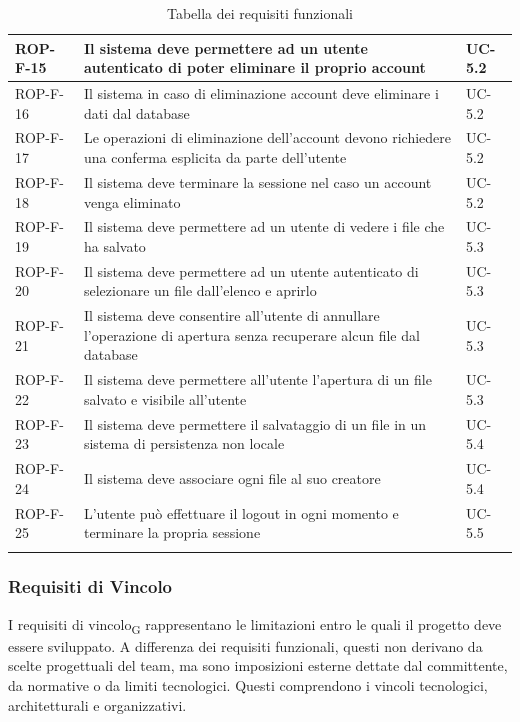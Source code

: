 \documentclass[11pt,a4paper]{article}
\begin{document}
\begin{longtable}{|p{}|>{\raggedright\arraybackslash}p{}|p{}|}
\hline
ROP-F-15 & Il sistema deve permettere ad un utente autenticato di poter eliminare il proprio account & UC-5.2 \\
\hline
ROP-F-16 & Il sistema in caso di eliminazione account deve eliminare i dati dal database & UC-5.2 \\
\hline
ROP-F-17 & Le operazioni di eliminazione dell'account devono richiedere una conferma esplicita da parte dell'utente & UC-5.2 \\
\hline
ROP-F-18 & Il sistema deve terminare la sessione nel caso un account venga eliminato & UC-5.2 \\
\hline
ROP-F-19 & Il sistema deve permettere ad un utente di vedere i file che ha salvato & UC-5.3 \\
\hline
ROP-F-20 & Il sistema deve permettere ad un utente autenticato di selezionare un file dall'elenco e aprirlo & UC-5.3 \\
\hline
ROP-F-21 & Il sistema deve consentire all'utente di annullare l'operazione di apertura senza recuperare alcun file dal database & UC-5.3 \\
\hline
ROP-F-22 & Il sistema deve permettere all'utente l'apertura di un file salvato e visibile all'utente & UC-5.3 \\
\hline
ROP-F-23 & Il sistema deve permettere il salvataggio di un file in un sistema di persistenza non locale & UC-5.4 \\
\hline
ROP-F-24 & Il sistema deve associare ogni file al suo creatore & UC-5.4 \\
\hline
ROP-F-25 & L'utente può effettuare il logout in ogni momento e terminare la propria sessione & UC-5.5 \\
\hline

\addlinespace[1em]
\caption{Tabella dei requisiti funzionali}
\end{longtable}

\newpage
\subsubsection{Requisiti di Vincolo}
I requisiti di vincolo\textsubscript{G} rappresentano le limitazioni entro le quali il progetto deve essere sviluppato. A differenza dei requisiti funzionali, questi non derivano da scelte progettuali del team, ma sono imposizioni esterne dettate dal committente, da normative o da limiti tecnologici.
Questi comprendono i vincoli tecnologici, architetturali e organizzativi.
\end{document}
